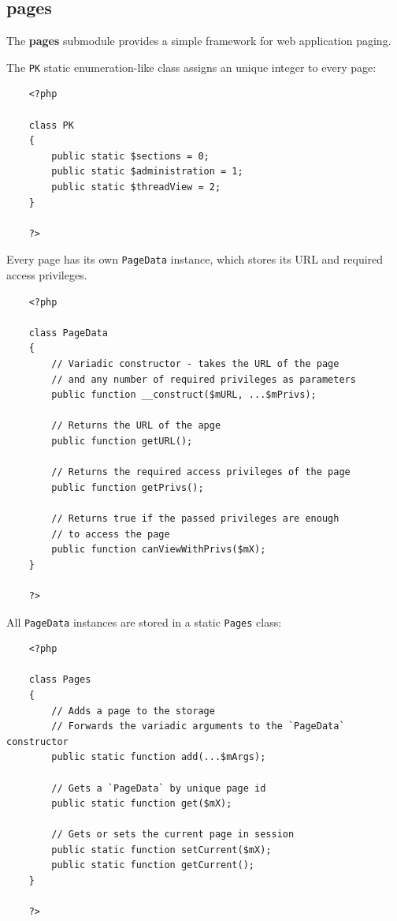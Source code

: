 \documentclass[12pt]{report}
\renewcommand\emph{\textbf}
\begin{document}
                \subsection{pages}

                    The \emph{pages} submodule provides a simple framework for web application paging.

                    The \texttt{PK} static enumeration-like class assigns an unique integer to every page:

                    \begin{verbatim}
    <?php

    class PK
    {
        public static $sections = 0;
        public static $administration = 1;
        public static $threadView = 2;
    }

    ?>
                    \end{verbatim}

                    Every page has its own \texttt{PageData} instance, which stores its URL and required access privileges.

                    \begin{verbatim}
    <?php

    class PageData
    {
        // Variadic constructor - takes the URL of the page
        // and any number of required privileges as parameters
        public function __construct($mURL, ...$mPrivs);

        // Returns the URL of the apge
        public function getURL();

        // Returns the required access privileges of the page
        public function getPrivs();

        // Returns true if the passed privileges are enough
        // to access the page
        public function canViewWithPrivs($mX);
    }

    ?>
                    \end{verbatim}

                    All \texttt{PageData} instances are stored in a static \texttt{Pages} class:

                    \begin{verbatim}
    <?php

    class Pages
    {
        // Adds a page to the storage
        // Forwards the variadic arguments to the `PageData` constructor
        public static function add(...$mArgs);

        // Gets a `PageData` by unique page id
        public static function get($mX);

        // Gets or sets the current page in session
        public static function setCurrent($mX);
        public static function getCurrent();
    }

    ?>
                    \end{verbatim}
\end{document}
